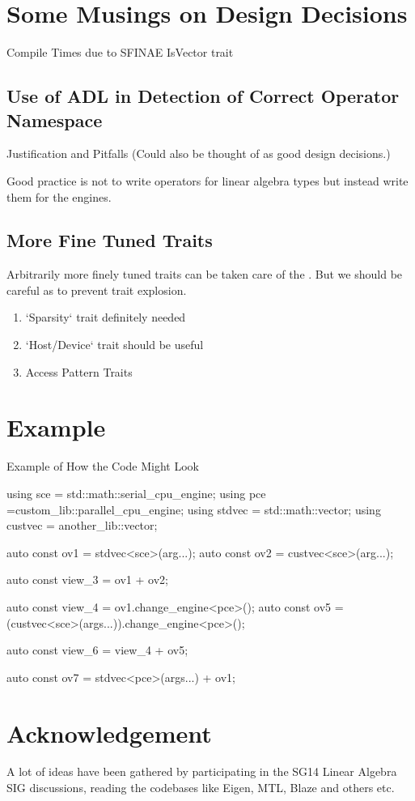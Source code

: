 \documentclass[oneside,11pt,a4paper]{jbarticle}
\begin{document}
\section{Some Musings on Design Decisions}
Compile Times due to SFINAE
IsVector trait
\subsection{Use of ADL in Detection of Correct Operator Namespace}
Justification and Pitfalls (Could also be thought of as good design decisions.)

Good practice is not to write operators for linear algebra types but instead
write them for the engines.
\subsection{More Fine Tuned Traits}
Arbitrarily more finely tuned traits can be taken care of the
.  But we should be careful as to prevent trait
explosion.
\begin{enumerate}
  \item  `Sparsity`  trait definitely needed
  \item  `Host/Device` trait should be useful
  \item  Access Pattern Traits
\end{enumerate}
\section{Example}

\begin{codecpp}{Example of How the Code Might Look}

  using sce = std::math::serial_cpu_engine;
  using pce =custom_lib::parallel_cpu_engine;
  using stdvec = std::math::vector;
  using custvec = another_lib::vector;

  auto const ov1 = stdvec<sce>(arg...);
  auto const ov2 = custvec<sce>(arg...);

  auto const view_3 = ov1 + ov2;

  auto const view_4 = ov1.change_engine<pce>();
  auto const ov5 = (custvec<sce>(args...)).change_engine<pce>();

  auto const view_6 = view_4 + ov5;

  auto const ov7 = stdvec<pce>(args...) + ov1;

\end{codecpp}
\section{Acknowledgement}
A lot of ideas have been gathered by participating in the SG14 Linear Algebra
SIG discussions, reading the codebases like Eigen, MTL, Blaze and others etc.

\printbibliography
\end{document}
